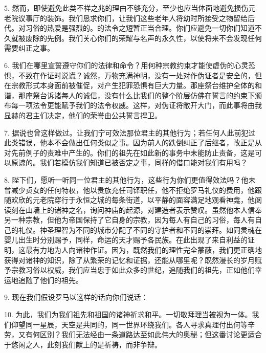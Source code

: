 5. 然而，即使避免此类不祥之兆的理由不够充分，至少也应当体面地避免损伤元老院议事厅的装饰。我们恳求你们，让我们这些老年人将幼时所接受之物留给后代。对习俗的热爱是强烈的。的法令之短暂正当合理。你们应避免一切你们知道不久就被废除的先例。我们关心你们的荣耀与名声的永久性，以使将来不会发现任何需要纠正之事。\par

6. 我们在哪里宣誓遵守你们的法律和命令？用何种宗教约束才能使虚伪的心灵恐惧，不致在作证时说谎？诚然，万物充满神明，没有一处对作伪证者是安全的，但在宗教形式本身面前被催促，对产生犯罪恐惧有巨大力量。那座祭台维护全体的和谐，那座祭台诉诸每人的诚信，没有什么比我们的整个阶层仿佛在誓言的约束下颁布每一项法令更能赋予我们的法令权威。这样，对伪证将敞开大门，而此事将由我显赫的君主们决定，他们的荣誉由公共誓言捍卫。\par

7. 据说也曾这样做过。让我们宁可效法那位君主的其他行为；若任何人此前犯过此类错误，他本不会做出任何类似之事。因为前人的跌倒纠正了后继者，改正是从对先前例子的责难中产生的。你们的祖先在如此新的事务中未能防止责备，这是可以原谅的。我们若模仿我们知道已被否定之事，同样的借口能对我们有用吗？\par

8. 陛下们，愿听一听同一位君主的其他行为，这些行为你们更值得效法吗？他未曾减少贞女的任何特权，他以贵族充任司铎职任，他不拒绝罗马礼仪的费用，他跟随欢欣的元老院穿行于永恒之城的每条街道，以平静的面容满足地观看神龛，他阅读刻在山墙上的诸神之名，询问神庙的起源，对建造者表示赞叹。虽然他本人信奉另一种宗教，但他为帝国保持了它自身的宗教，因为每人有自己的习俗，每人有自己的礼仪。神圣理智为不同的城市分配了不同的守护者和不同的崇拜。如同灵魂在婴儿出生时分别赐予，同样，命运的天才赐予各民族。在此出现了来自利益的证明，这最有力地为人向诸神作证。因为，既然我们的理性完全蒙蔽，我们更正确地获得对诸神的知识，除了从繁荣的记忆和证据，还能从哪里呢？既然漫长的岁月赋予宗教习俗以权威，我们应当忠于如此众多的世纪，追随我们的祖先，正如他们幸运地追随了他们的祖先。\par

9. 现在我们假设罗马以这样的话向你们说话：\par

10. 为此，我们为我们祖先和祖国的诸神祈求和平。一切敬拜理当被视为一体。我们仰望同一星辰，天空是共同的，同一世界环绕我们。各人寻求真理付出何等辛劳，又有何区别？我们无法经由一条道路达至如此伟大的奥秘；但这番讨论更适合于悠闲之人，此刻我们献上的是祈祷，而非争辩。\par

